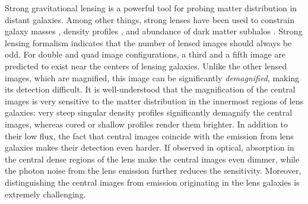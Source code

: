 \documentclass[chicago]{emulateapj}
\begin{document}
Strong gravitational lensing is a powerful tool for probing matter distribution in distant galaxies. Among other things, strong lenses have been used to constrain galaxy masses  \citep[e.g.][]{}, density profiles \citep[e.g.][]{}, and abundance of dark matter subhalos \citep[e.g.][]{}.
Strong lensing formalism indicates that the number of lensed images should always be odd. For double and quad image configurations, a third and a fifth image are predicted to exist near the centers of lensing galaxies. Unlike the other lensed images, which are magnified, this image can be significantly \emph{demagnified}, making its detection difficult.  It is well-understood that the magnification of the central images is very sensitive to the matter distribution in the innermost regions of lens galaxies: very steep singular density profiles significantly demagnify the central images, whereas cored or shallow profiles render them brighter. %
In addition to their low flux, the fact that central images coincide with the emission from lens galaxies makes their detection even harder.
If observed in optical, absorption in the central dense regions of the lens make the central images even dimmer, while the photon noise from the lens emission further reduces the sensitivity. Moreover, distinguishing the central images from emission originating in the lens galaxies is extremely  challenging.




\end{document}
